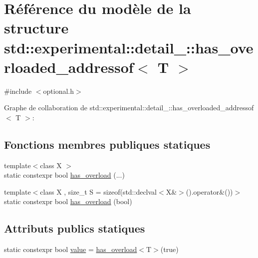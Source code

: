 \hypertarget{structstd_1_1experimental_1_1detail___1_1has__overloaded__addressof}{}\section{Référence du modèle de la structure std\+:\+:experimental\+:\+:detail\+\_\+\+:\+:has\+\_\+overloaded\+\_\+addressof$<$ T $>$}
\label{structstd_1_1experimental_1_1detail___1_1has__overloaded__addressof}


{\ttfamily \#include $<$optional.\+h$>$}



Graphe de collaboration de std\+:\+:experimental\+:\+:detail\+\_\+\+:\+:has\+\_\+overloaded\+\_\+addressof$<$ T $>$\+:
\subsection*{Fonctions membres publiques statiques}
\begin{DoxyCompactItemize}
\item 
{\footnotesize template$<$class X $>$ }\\static constexpr bool \hyperlink{structstd_1_1experimental_1_1detail___1_1has__overloaded__addressof_a4656eb4d63080eef6563dca4894f8623}{has\+\_\+overload} (...)
\item 
{\footnotesize template$<$class X , size\+\_\+t S = sizeof(std\+::declval$<$\+X\&$>$().\+operator\&())$>$ }\\static constexpr bool \hyperlink{structstd_1_1experimental_1_1detail___1_1has__overloaded__addressof_a3afc4b4cc2df22327c0f380cec60fb1f}{has\+\_\+overload} (bool)
\end{DoxyCompactItemize}
\subsection*{Attributs publics statiques}
\begin{DoxyCompactItemize}
\item 
static constexpr bool \hyperlink{structstd_1_1experimental_1_1detail___1_1has__overloaded__addressof_a7ff16212ecdca54a0328b1cb4d676cf9}{value} = \hyperlink{structstd_1_1experimental_1_1detail___1_1has__overloaded__addressof_a4656eb4d63080eef6563dca4894f8623}{has\+\_\+overload}$<$T$>$(true)
\end{DoxyCompactItemize}


